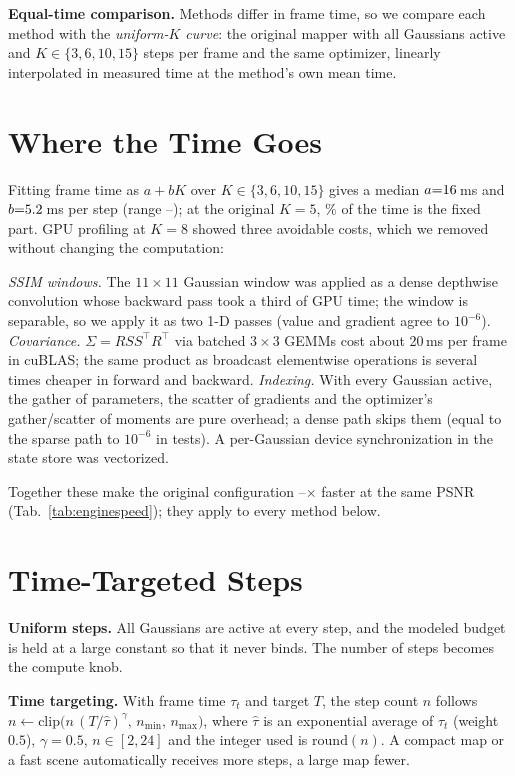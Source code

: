 \documentclass[10pt,twocolumn,letterpaper]{article}
\begin{document}
\textbf{Equal-time comparison.} Methods differ in frame time, so we compare each method with the \emph{uniform-$K$ curve}: the original mapper with all Gaussians active and $K\in\{3,6,10,15\}$ steps per frame and the same optimizer, linearly interpolated in measured time at the method's own mean time.

\section{Where the Time Goes}
\label{sec:core}
Fitting frame time as $a+bK$ over $K\in\{3,6,10,15\}$ gives a median $a{=}16$\,ms and $b{=}5.2$\,ms per step (range \engCostSlopeMin--\engCostSlopeMax); at the original $K{=}5$, \engFixedShareAtFive\% of the time is the fixed part. GPU profiling at $K{=}8$ showed three avoidable costs, which we removed without changing the computation:

\emph{SSIM windows.} The $11{\times}11$ Gaussian window was applied as a dense depthwise convolution whose backward pass took a third of GPU time; the window is separable, so we apply it as two 1-D passes (value and gradient agree to $10^{-6}$). \emph{Covariance.} $\Sigma=RSS^\top R^\top$ via batched $3{\times}3$ GEMMs cost about 20\,ms per frame in cuBLAS; the same product as broadcast elementwise operations is several times cheaper in forward and backward. \emph{Indexing.} With every Gaussian active, the gather of parameters, the scatter of gradients and the optimizer's gather/scatter of moments are pure overhead; a dense path skips them (equal to the sparse path to $10^{-6}$ in tests). A per-Gaussian device synchronization in the state store was vectorized.

Together these make the original configuration \engSpeedupMin--\engSpeedupMax$\times$ faster at the same PSNR (Tab.~\ref{tab:enginespeed}); they apply to every method below.



\section{Time-Targeted Steps}
\label{sec:method}
\textbf{Uniform steps.} All Gaussians are active at every step, and the modeled budget is held at a large constant so that it never binds. The number of steps becomes the compute knob.

\textbf{Time targeting.} With frame time $\tau_t$ and target $T$, the step count $n$ follows
$n \leftarrow \mathrm{clip}\big(n\,(T/\hat\tau)^{\gamma},\,n_{\min},\,n_{\max}\big)$, where $\hat\tau$ is an exponential average of $\tau_t$ (weight $0.5$), $\gamma{=}0.5$, $n\in[2,24]$ and the integer used is $\mathrm{round}(n)$. A compact map or a fast scene automatically receives more steps, a large map fewer.
\end{document}
